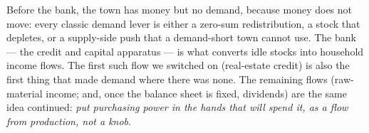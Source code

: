 \documentclass[11pt]{article}
\begin{document}
Before the bank, the town has money but no demand, because money does not move:
every classic demand lever is either a zero-sum redistribution, a stock that
depletes, or a supply-side push that a demand-short town cannot use. The bank ---
the credit and capital apparatus --- is what converts idle stocks into household
income flows. The first such flow we switched on (real-estate credit) is also the
first thing that made demand where there was none. The remaining flows (raw-material
income; and, once the balance sheet is fixed, dividends) are the same idea
continued: \emph{put purchasing power in the hands that will spend it, as a flow
from production, not a knob}.
\end{document}
